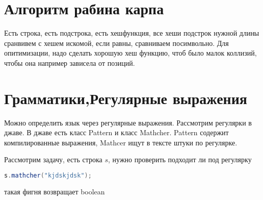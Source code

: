 \documentclass[14pt]{extarticle}
\begin{document}
    \section{Алгоритм рабина карпа}
    Есть строка, есть подстрока, есть хешфункция, все хеши подстрок нужной длины сранвивем с хешем искомой, если равны, сравниваем посимвольно. Для опитимизации, надо сделать хорошую хеш функцию, чтоб было малок коллизий, чтобы она например зависела от позиций.
    \section{Грамматики,Регулярные выражения}
    Можно определить язык через регулярные выражения. Рассмотрим регулярки в джаве. В джаве есть класс Pattern и класс Mathcher. Pattern содержит компилированные выражения, Mathcer ищут в тексте штуки по регулярке.

    Рассмотрим задачу, есть строка $s$, нужно проверить подходит ли под регулярку 
 \begin{lstlisting}[language=Java] 
 s.mathcher("kjdskjdsk");
\end{lstlisting} 
    такая фигня возвращает boolean
\end{document}
